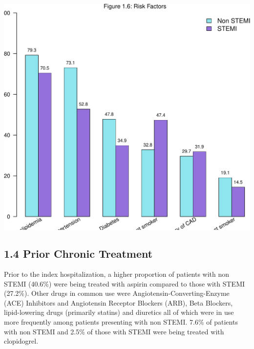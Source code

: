 \documentclass[
]{article}
\begin{document}
\includegraphics{ACSIS_2024_v1_pdf_files/figure-latex/unnamed-chunk-23-1.pdf}

\pagebreak

\subsection{1.4 Prior Chronic Treatment}\label{prior-chronic-treatment}

Prior to the index hospitalization, a higher proportion of patients with
non STEMI (40.6\%) were being treated with aspirin compared to those
with STEMI (27.2\%). Other drugs in common use were
Angiotensin-Converting-Enzyme (ACE) Inhibitors and Angiotensin Receptor
Blockers (ARB), Beta Blockers, lipid-lowering drugs (primarily statins)
and diuretics all of which were in use more frequently among patients
presenting with non STEMI. 7.6\% of patients with non STEMI and 2.5\% of
those with STEMI were being treated with clopidogrel.

~
\end{document}
